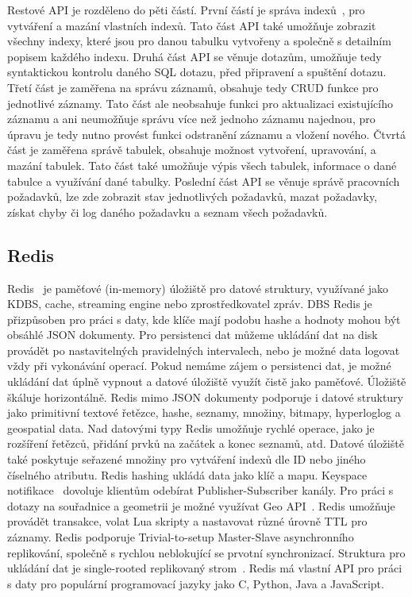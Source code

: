 \documentclass[czech,master,dept460,male,csharp,cpdeclaration]{diploma}
\begin{document}
	Restové API je rozděleno do pěti částí. První částí je správa indexů~\cite{index}, pro vytváření a mazání vlastních indexů. Tato část API také umožňuje zobrazit všechny indexy, které jsou pro danou tabulku vytvořeny a společně s detailním popisem každého indexu. Druhá část API se věnuje dotazům, umožňuje tedy syntaktickou kontrolu daného SQL dotazu, před připravení a spuštění dotazu. Třetí část je zaměřena na správu záznamů, obsahuje tedy CRUD funkce pro jednotlivé záznamy. Tato část ale neobsahuje funkci pro aktualizaci existujícího záznamu a ani neumožňuje správu více než jednoho záznamu najednou, pro úpravu je tedy nutno provést funkci odstranění záznamu a vložení nového. Čtvrtá část je zaměřena správě tabulek, obsahuje možnost vytvoření, upravování, a mazání tabulek. Tato část také umožňuje výpis všech tabulek, informace o dané tabulce a využívání dané tabulky. Poslední část API se věnuje správě pracovních požadavků, lze zde zobrazit stav jednotlivých požadavků, mazat požadavky, získat chyby či log daného požadavku a seznam všech požadavků.
		
	\subsection{Redis} \label{lab-redis}
	
	Redis~\cite{redis} je paměťové (in-memory) úložiště pro datové struktury, využívané jako KDBS, cache, streaming engine nebo zprostředkovatel zpráv. DBS Redis je přizpůsoben pro práci s daty, kde klíče mají podobu hashe a hodnoty mohou být obsáhlé JSON dokumenty. Pro persistenci dat můžeme ukládání dat na disk provádět po nastavitelných pravidelných intervalech, nebo je možné data logovat vždy při vykonávání operací. Pokud nemáme zájem o persistenci dat, je možné ukládání dat úplně vypnout a datové úložiště využít čistě jako paměťové. Úložiště škáluje horizontálně. Redis mimo JSON dokumenty podporuje i datové struktury jako primitivní textové řetězce, hashe, seznamy, množiny, bitmapy, hyperloglog a geospatial data. Nad datovými typy Redis umožňuje rychlé operace, jako je rozšíření řetězců, přidání prvků na začátek a konec seznamů, atd. Datové úložiště také poskytuje seřazené množiny pro vytváření indexů dle ID nebo jiného číselného atributu. Redis hashing ukládá data jako klíč a mapu. Keyspace notifikace~\cite{redis-keyspace-not} dovoluje klientům odebírat Publisher-Subscriber kanály. Pro práci s dotazy na souřadnice a geometrii je možné využívat Geo API~\cite{redis-geospatial}. Redis umožňuje provádět transakce, volat Lua skripty a nastavovat různé úrovně TTL pro záznamy. Redis podporuje Trivial-to-setup Master-Slave asynchronního replikování, společně s rychlou neblokující se prvotní synchronizací. Struktura pro ukládání dat je single-rooted replikovaný strom~\cite{tree-replic}. Redis má vlastní API pro práci s daty pro populární programovací jazyky jako C, Python, Java a JavaScript.
	
\end{document}
